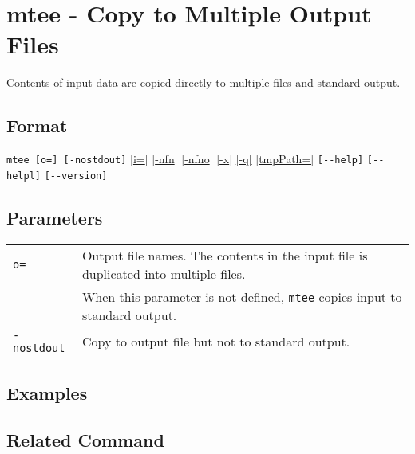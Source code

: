 
%

\section{mtee - Copy to Multiple Output Files\label{sect:mtee}}
Contents of input data are copied directly to multiple files and standard output. 


\subsection*{Format}
\verb|mtee [o=] [-nostdout]|
[\hyperref[sect:option_i]{i=}] 
[\hyperref[sect:option_nfn]{-nfn}] 
[\hyperref[sect:option_nfno]{-nfno}]  
[\hyperref[sect:option_x]{-x}] 
\hyperref[sect:option_q]{[-q]}
\hyperref[sect:option_option_tmppath]{[tmpPath=]}
\verb|[--help]|
\verb|[--helpl]|
\verb|[--version]|\\

\subsection*{Parameters}
\begin{table}[htbp]
{\small
\begin{tabular}{ll}
\verb|o=|        & Output file names. The contents in the input file is duplicated into multiple files. \\
			& When this parameter is not defined, \verb|mtee| copies input to standard output.\\
\verb|-nostdout| & Copy to output file but not to standard output.\\
\end{tabular} 
}
\end{table} 

\subsection*{Examples}


\subsection*{Related Command}

%

